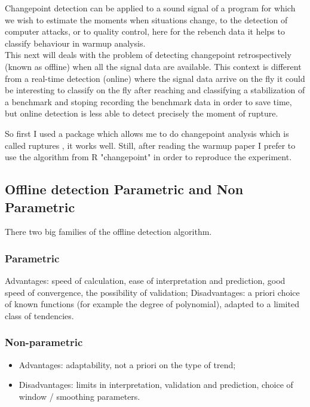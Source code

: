 \documentclass{article}
\begin{document}
Changepoint detection can be applied to a sound signal of a program for which we wish to estimate the moments when situations change, to the detection of computer attacks, or to quality control, here for the rebench data it helps to classify behaviour in warmup analysis. \\

This next will deals with the problem of detecting changepoint retrospectively (known as offline) when all the signal data are available. This context is different from a real-time detection (online) where the signal data arrive on the fly it could be interesting to classify on the fly after reaching and classifying a stabilization of a benchmark and stoping recording the benchmark data in order to save time, but online detection is less able to detect precisely the moment of rupture.

So first I used a package which allows me to do changepoint analysis which is called ruptures \citep{truong2020selective}, it works well. Still, after reading the warmup paper I prefer to use the algorithm from R "changepoint" \citep{killick2014changepoint} in order to reproduce the experiment.

\subsection{Offline detection Parametric and Non Parametric}
 
 
There two big families of the offline detection algorithm.

\subsubsection{Parametric}

Advantages: speed of calculation, ease of interpretation and prediction,
good speed of convergence, the possibility of validation;
Disadvantages: a priori choice of known functions (for example the degree of polynomial), adapted to a limited class of tendencies.

\subsubsection{Non-parametric}

\begin{itemize}
    \item Advantages: adaptability, not a priori on the type of trend;
    \item Disadvantages: limits in interpretation, validation and prediction, choice of window / smoothing parameters.
\end{itemize}
\end{document}
